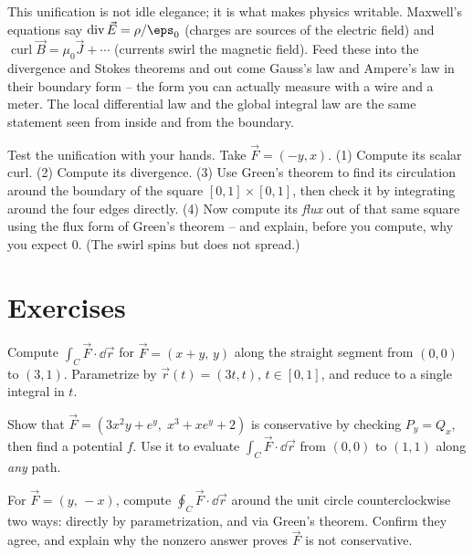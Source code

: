 \begin{connectionbox}
This unification is not idle elegance; it is what makes physics writable. Maxwell's
equations say $\operatorname{div}\vec E = \rho/\eps_0$ (charges are sources of the
electric field) and $\operatorname{curl}\vec B = \mu_0\vec J + \cdots$ (currents
swirl the magnetic field). Feed these into the divergence and Stokes theorems and
out come Gauss's law and Ampere's law in their boundary form -- the form you can
actually measure with a wire and a meter. The local differential law and the global
integral law are the same statement seen from inside and from the boundary.
\end{connectionbox}

\begin{labbox}
Test the unification with your hands. Take $\vec F=(-y,x)$.
(1) Compute its scalar curl. (2) Compute its divergence. (3) Use Green's theorem to
find its circulation around the boundary of the square $[0,1]\times[0,1]$, then
check it by integrating around the four edges directly. (4) Now compute its
\emph{flux} out of that same square using the flux form of Green's theorem -- and
explain, before you compute, why you expect $0$. (The swirl spins but does not
spread.)
\end{labbox}

\section{Exercises}
\label{ch35:exercises}

\begin{exercise}
\label{ch35:exr-lineint}
Compute $\displaystyle\int_C \vec F\cdot\dd\vec r$ for $\vec F=(x+y,\,y)$ along the
straight segment from $(0,0)$ to $(3,1)$. Parametrize by $\vec r(t)=(3t,t)$,
$t\in[0,1]$, and reduce to a single integral in $t$.
\end{exercise}

\begin{exercise}
\label{ch35:exr-conservative}
Show that $\vec F=(3x^2y + e^y,\; x^3 + xe^y + 2)$ is conservative by checking
$P_y=Q_x$, then find a potential $f$. Use it to evaluate $\int_C\vec F\cdot\dd\vec r$
from $(0,0)$ to $(1,1)$ along \emph{any} path.
\end{exercise}

\begin{exercise}
\label{ch35:exr-notconservative}
For $\vec F=(y,\,-x)$, compute $\oint_C\vec F\cdot\dd\vec r$ around the unit circle
counterclockwise two ways: directly by parametrization, and via Green's theorem.
Confirm they agree, and explain why the nonzero answer proves $\vec F$ is not
conservative.
\end{exercise}

